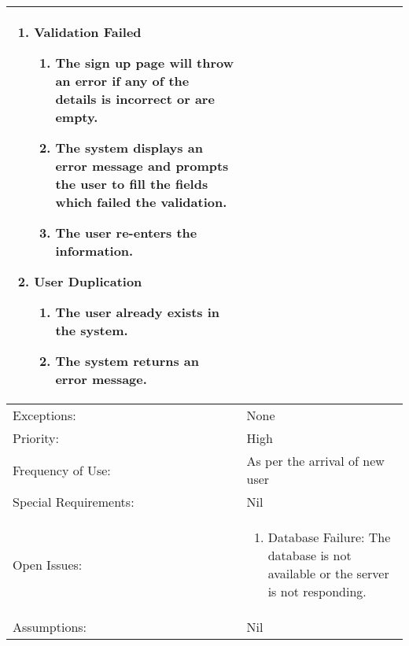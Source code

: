 \documentclass[12pt]{article}
\begin{document}
\begin{center}
\begin{longtable}{ | p{3cm} | p{3cm} | p{3cm} | p{3cm} | }
{            \begin{enumerate}
                \item Validation Failed
                \begin{enumerate}
                    \item The sign up page will throw an error if any of the details is incorrect or are empty.
                    \item The system displays an error message and prompts the user to fill the fields which failed the validation.
                    \item The user re-enters the information.
                \end{enumerate}
                \item User Duplication
                \begin{enumerate}
                    \item The user already exists in the system.
                    \item The system returns an error message.
                \end{enumerate}
                
            \end{enumerate}
        }\\
        \hline
        Exceptions: & \multicolumn{3}{p{9cm}|}{
            None
        }\\
        \hline
        \hline
        Priority: & \multicolumn{3}{p{9cm}|}{High}\\
        \hline
        Frequency of Use: & \multicolumn{3}{p{9cm}|}{As per the arrival of new user}\\
        \hline
        Special Requirements: & \multicolumn{3}{p{9cm}|}{Nil}\\
        \hline
        Open Issues: & \multicolumn{3}{p{9cm}|}{
            \begin{enumerate}
                \item Database Failure: The database is not available or the server is not responding.
            \end{enumerate}
        }\\
        \hline
        Assumptions:& \multicolumn{3}{p{9cm}|}{Nil}\\
        \hline
    \end{longtable}
\end{center}
    
\end{document}
